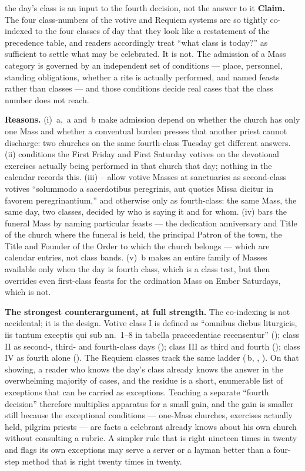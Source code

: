 \begin{synthesis}{the day's class is an input to the fourth decision, not the
answer to it}
\textbf{Claim.} The four class-numbers of the votive and Requiem systems are
so tightly co-indexed to the four classes of day that they look like a
restatement of the precedence table, and readers accordingly treat ``what
class is today?'' as sufficient to settle what may be celebrated. It is not.
The admission of a Mass category is governed by an independent set of
conditions --- place, personnel, standing obligations, whether a rite is
actually performed, and named feasts rather than classes --- and those
conditions decide real cases that the class number does not reach.

\textbf{Reasons.} (i) \,a, \,a and \,b make
admission depend on whether the church has only one Mass and whether a
conventual burden presses that another priest cannot discharge: two churches
on the same fourth-class Tuesday get different answers. (ii) 
conditions the First Friday and First Saturday votives on the devotional
exercises actually being performed in that church that day; nothing in the
calendar records this. (iii) -- allow votive Masses at
sanctuaries as second-class votives ``solummodo a sacerdotibus peregrinis, aut
quoties Missa dicitur in favorem peregrinantium,'' and otherwise only as
fourth-class: the same Mass, the same day, two classes, decided by who is
saying it and for whom. (iv)  bars the funeral Mass by naming
particular feasts --- the dedication anniversary and Title of the church where
the funeral is held, the principal Patron of the town, the Title and Founder of
the Order to which the church belongs --- which are calendar entries, not class
bands. (v) \,b makes an entire family of Masses available only when
the day is fourth class, which is a class test, but  then overrides
even first-class feasts for the ordination Mass on Ember Saturdays, which is
not.

\textbf{The strongest counterargument, at full strength.} The co-indexing is
not accidental; it is the design. Votive class I is defined as ``omnibus
diebus liturgicis, iis tantum exceptis qui sub nn.~1--8 in tabella
praecedentiae recensentur'' (); class II as second-, third- and
fourth-class days (); class III as third and fourth (); class
IV as fourth alone (). The Requiem classes track the same ladder
(\,b, , ). On that showing, a reader who knows the
day's class already knows the answer in the overwhelming majority of cases,
and the residue is a short, enumerable list of exceptions that can be carried
as exceptions. Teaching a separate ``fourth decision'' therefore multiplies
apparatus for a small gain, and the gain is smaller still because the
exceptional conditions --- one-Mass churches, exercises actually held,
pilgrim priests --- are facts a celebrant already knows about his own church
without consulting a rubric. A simpler rule that is right nineteen times in
twenty and flags its own exceptions may serve a server or a layman better than
a four-step method that is right twenty times in twenty.


\end{synthesis}
